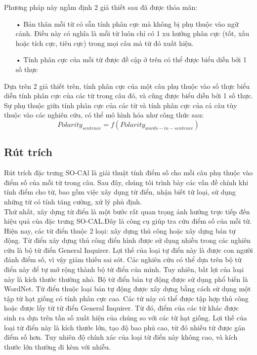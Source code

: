 Phương pháp này ngầm định 2 giả thiết sau đã được thỏa mãn:
\begin{itemize}
\item[•] Bản thân mỗi từ có sẵn tính phân cực mà không bị phụ thuộc vào ngữ cảnh. Điều này có nghĩa là mỗi từ luôn chỉ có 1 xu hướng phân cực (tốt, xấu hoặc tích cực, tiêu cực) trong mọi câu mà từ đó xuất hiện.
\item[•] Tính phân cực của mỗi từ được đề cập ở trên có thể được biểu diễn bởi 1 số thực
\end{itemize}
Dựa trên 2 giả thiết trên, tính phân cực của một câu phụ thuộc vào số thực biểu diễn tính phân cực của các từ trong câu đó, và cũng được biểu diễn bởi 1 số thực. Sự phụ thuộc giữa tính phân cực của các từ và tính phân cực của cả câu tùy thuộc vào các nghiên cứu, có thể mô hình hóa như công thức sau:
\begin{equation}
Polarity_{sentence}=f(Polarity_{words-in-sentence})
\end{equation}
\subsection*{Rút trích}
Rút trích đặc trưng SO-CAl là giải thuật tính điểm số cho mỗi câu phụ thuộc vào điểm số của mỗi từ trong câu. Sau đây, chúng tôi trình bày các vấn đề chính khi tính điểm cho từ, bao gồm việc xây dụng từ điển, nhận biết từ loại, sử dụng những từ có tính tăng cường, xử lý phủ định.\\

Thứ nhất, xây dựng từ điển là một bước rất quan trọng ảnh hưởng trực tiếp đến hiệu quả của đặc trưng SO-CAL.Đây là công cụ giúp tra cứu điểm số của mỗi từ. Hiện nay, các từ điển thuộc 2 loại: xây dựng thủ công hoặc xây dựng bán tự động. Từ điển xây dựng thủ công điển hình được sử dụng nhiều trong các nghiên cứu là bộ từ điển General Inquirer. Lợi thế của loại tự điển này là được con người đánh điểm số, vì vậy giảm thiếu sai sót. Các nghiên cứu có thể dựa trên bộ từ điển này để tự mở rộng thành bộ từ điển của mình. Tuy nhiên, bất lợi của loại này là kích thước thường nhỏ. Bộ từ điển bán tự động được sử dụng phổ biến là WordNet. Từ điển thuộc loại bán tự động được xây dựng bằng cách sử dụng một tập từ hạt giống có tính phân cực cao. Các từ này có thể được tập hợp thủ công hoặc được lấy từ từ điển General Inquirer. Từ đó, điểm của các từ khác được sinh ra dựa trên tần số xuất hiện của chúng so với các từ hạt giống. Lợi thế của loại từ điển này là kích thước lớn, tạo độ bao phủ cao, từ đó nhiều từ được gán điểm số hơn. Tuy nhiên độ chính xác của loại từ điển này không cao, và kích thước lớn thường đi kèm với nhiễu. \\

